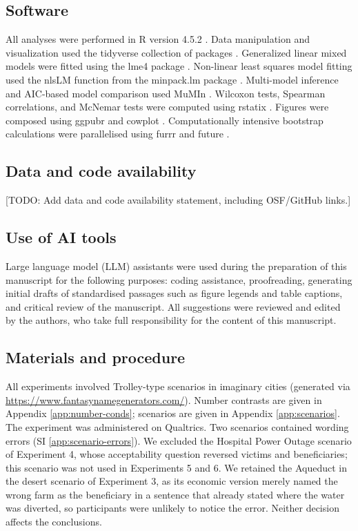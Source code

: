 \documentclass[
]{article}
\begin{document}
\subsection{Software}\label{software}

All analyses were performed in R version 4.5.2 \autocite{RCoreTeam2025}. Data manipulation and visualization used the tidyverse collection of packages \autocite{Wickham2019}. Generalized linear mixed models were fitted using the lme4 package \autocite{Bates2015}. Non-linear least squares model fitting used the nlsLM function from the minpack.lm package \autocite{Elzhov2023}. Multi-model inference and AIC-based model comparison used MuMIn \autocite{Barton2025}. Wilcoxon tests, Spearman correlations, and McNemar tests were computed using rstatix \autocite{Kassambara2023a}. Figures were composed using ggpubr \autocite{Kassambara2023b} and cowplot \autocite{Wilke2024}. Computationally intensive bootstrap calculations were parallelised using furrr \autocite{Vaughan2022} and future \autocite{Bengtsson2021}.

\subsection{Data and code availability}\label{data-and-code-availability}

{[}TODO: Add data and code availability statement, including OSF/GitHub links.{]}

\subsection{Use of AI tools}\label{use-of-ai-tools}

Large language model (LLM) assistants were used during the preparation of this manuscript for the following purposes: coding assistance, proofreading, generating initial drafts of standardised passages such as figure legends and table captions, and critical review of the manuscript. All suggestions were reviewed and edited by the authors, who take full responsibility for the content of this manuscript.

\subsection{Materials and procedure}\label{materials-and-procedure}

All experiments involved Trolley-type scenarios in imaginary cities (generated via \url{https://www.fantasynamegenerators.com/}). Number contrasts are given in Appendix \ref{app:number-conds}; scenarios are given in Appendix \ref{app:scenarios}. The experiment was administered on Qualtrics. Two scenarios contained wording errors (SI \ref{app:scenario-errors}). We excluded the Hospital Power Outage scenario of Experiment 4, whose acceptability question reversed victims and beneficiaries; this scenario was not used in Experiments 5 and 6. We retained the Aqueduct in the desert scenario of Experiment 3, as its economic version merely named the wrong farm as the beneficiary in a sentence that already stated where the water was diverted, so participants were unlikely to notice the error. Neither decision affects the conclusions.
\end{document}
